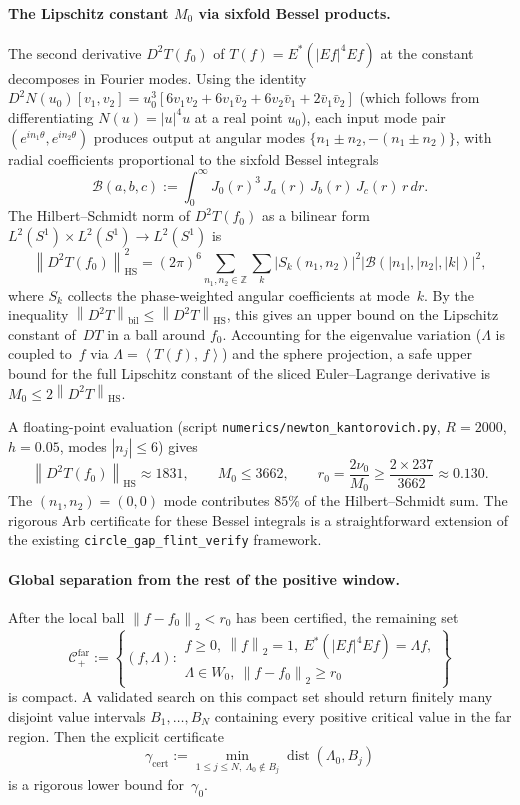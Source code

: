 \documentclass[12pt]{article}
\theoremstyle{definition}
\theoremstyle{remark}
\newcommand{\Z}{\mathbb{Z}}
\newcommand{\abs}[1]{\left|#1\right|}
\newcommand{\norm}[1]{\left\|#1\right\|}
\newcommand{\ip}[2]{\left\langle #1,\, #2\right\rangle}
\begin{document}
\paragraph{The Lipschitz constant $M_0$ via sixfold Bessel products.}
The second derivative $D^2T(f_0)$ of $T(f)=E^*(|Ef|^4Ef)$ at the constant
decomposes in Fourier modes.  Using the identity
$D^2N(u_0)[v_1,v_2]=u_0^3[6v_1v_2+6v_1\bar v_2+6v_2\bar v_1+2\bar v_1\bar v_2]$
(which follows from differentiating $N(u)=|u|^4u$ at a real point $u_0$),
each input mode pair $(e^{in_1\theta},e^{in_2\theta})$ produces output at
angular modes $\{n_1\pm n_2,-(n_1\pm n_2)\}$, with radial coefficients
proportional to the sixfold Bessel integrals
\[
  \mathcal B(a,b,c)
  :=
  \int_0^\infty J_0(r)^3\,J_a(r)\,J_b(r)\,J_c(r)\,r\,dr.
\]
The Hilbert--Schmidt norm of $D^2T(f_0)$ as a bilinear form
$L^2(S^1)\times L^2(S^1)\to L^2(S^1)$ is
\[
  \norm{D^2T(f_0)}_{\mathrm{HS}}^2
  =
  (2\pi)^6\sum_{n_1,n_2\in\Z}
  \sum_k \abs{S_k(n_1,n_2)}^2\abs{\mathcal B(|n_1|,|n_2|,|k|)}^2,
\]
where $S_k$ collects the phase-weighted angular coefficients at mode~$k$.
By the inequality
$\norm{D^2T}_{\mathrm{bil}}\leq\norm{D^2T}_{\mathrm{HS}}$, this
gives an upper bound on the Lipschitz constant of~$DT$ in a ball around $f_0$.
Accounting for the eigenvalue variation ($\Lambda$ is coupled to~$f$ via
$\Lambda=\ip{T(f)}{f}$) and the sphere projection, a safe upper bound
for the full Lipschitz constant of the sliced Euler--Lagrange derivative
is $M_0\leq 2\norm{D^2T}_{\mathrm{HS}}$.

A floating-point evaluation (script \texttt{numerics/newton\_kantorovich.py},
$R=2000$, $h=0.05$, modes $|n_j|\leq 6$) gives
\[
  \norm{D^2T(f_0)}_{\mathrm{HS}}\approx 1831,
  \qquad
  M_0\leq 3662,
  \qquad
  r_0=\frac{2\nu_0}{M_0}\geq\frac{2\times 237}{3662}\approx 0.130.
\]
The $(n_1,n_2)=(0,0)$ mode contributes $85\%$ of the Hilbert--Schmidt
sum.  The rigorous Arb certificate for these Bessel integrals is a
straightforward extension of the existing \texttt{circle\_gap\_flint\_verify}
framework.

\paragraph{Global separation from the rest of the positive window.}
After the local ball $\norm{f-f_0}_2<r_0$ has been certified, the remaining
set
\[
  \mathcal C_+^{\mathrm{far}}
  :=
  \left\{
    (f,\Lambda):
    \begin{array}{l}
      f\geq0,\ \norm{f}_2=1,\ E^*(|Ef|^4Ef)=\Lambda f,\\
      \Lambda\in W_0,\ \norm{f-f_0}_2\geq r_0
    \end{array}
  \right\}
\]
is compact.  A validated search on this compact set should return finitely
many disjoint value intervals $B_1,\ldots,B_N$ containing every positive
critical value in the far region.  Then the explicit certificate
\[
  \gamma_{\mathrm{cert}}
  :=
  \min_{1\leq j\leq N,\ \Lambda_0\notin B_j}
  \operatorname{dist}(\Lambda_0,B_j)
\]
is a rigorous lower bound for~$\gamma_0$.
\end{document}

